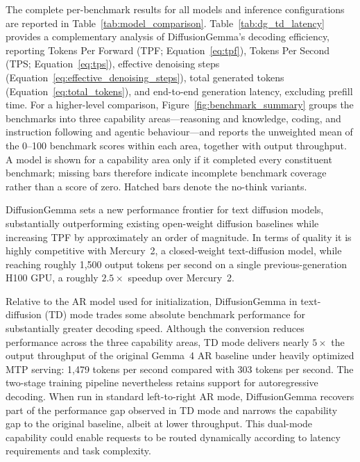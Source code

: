 \documentclass[11pt, a4paper, logo, copyright, gdm]{google}
\begin{document}
The complete per-benchmark results for all models and inference configurations are reported in Table~\ref{tab:model_comparison}. Table~\ref{tab:dg_td_latency} provides a complementary analysis of DiffusionGemma's decoding efficiency, reporting Tokens Per Forward (TPF; Equation~\ref{eq:tpf}), Tokens Per Second (TPS; Equation~\ref{eq:tps}), effective denoising steps (Equation~\ref{eq:effective_denoising_steps}), total generated tokens (Equation~\ref{eq:total_tokens}), and end-to-end generation latency, excluding prefill time. For a higher-level comparison, Figure~\ref{fig:benchmark_summary} groups the benchmarks into three capability areas---reasoning and knowledge, coding, and instruction following and agentic behaviour---and reports the unweighted mean of the 0--100 benchmark scores within each area, together with output throughput. A model is shown for a capability area only if it completed every constituent benchmark; missing bars therefore indicate incomplete benchmark coverage rather than a score of zero. Hatched bars denote the no-think variants.

DiffusionGemma sets a new performance frontier for text diffusion models, substantially outperforming existing open-weight diffusion baselines while increasing TPF by approximately an order of magnitude. In terms of quality it is  highly competitive with Mercury~2, a closed-weight text-diffusion model, while reaching roughly 1,500 output tokens per second on a single previous-generation H100 GPU, a roughly $2.5\times$ speedup over Mercury~2.

Relative to the AR model used for initialization, DiffusionGemma in text-diffusion (TD) mode trades some absolute benchmark performance for substantially greater decoding speed. Although the conversion reduces performance across the three capability areas, TD mode delivers nearly $5\times$ the output throughput of the original Gemma~4 AR baseline under heavily optimized MTP serving: 1,479 tokens per second compared with 303 tokens per second. The two-stage training pipeline nevertheless retains support for autoregressive decoding. When run in standard left-to-right AR mode, DiffusionGemma recovers part of the performance gap observed in TD mode and narrows the capability gap to the original baseline, albeit at lower throughput. This dual-mode capability could enable requests to be routed dynamically according to latency requirements and task complexity.
\end{document}

